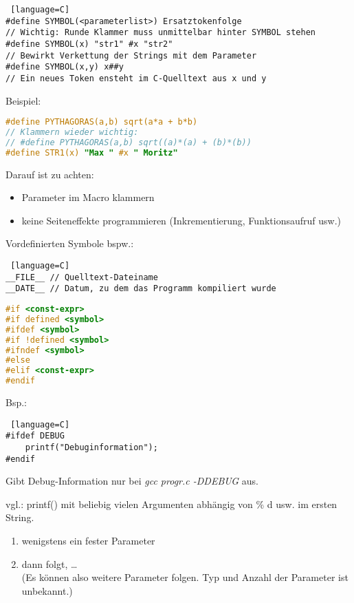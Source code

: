 \begin{multicols*}{3}

\begin{lstlisting} [language=C]
#define SYMBOL(<parameterlist>)	Ersatztokenfolge
// Wichtig: Runde Klammer muss unmittelbar hinter SYMBOL stehen
#define SYMBOL(x) "str1" #x "str2"
// Bewirkt Verkettung der Strings mit dem Parameter
#define SYMBOL(x,y) x##y
// Ein neues Token ensteht im C-Quelltext aus x und y
\end{lstlisting}
Beispiel:
\begin{lstlisting}[language=C]
#define PYTHAGORAS(a,b) sqrt(a*a + b*b)
// Klammern wieder wichtig:
// #define PYTHAGORAS(a,b) sqrt((a)*(a) + (b)*(b))
#define STR1(x) "Max " #x " Moritz"
\end{lstlisting}
Darauf ist zu achten:
\begin{itemize}
\item Parameter im Macro klammern
\item keine Seiteneffekte programmieren (Inkrementierung, Funktionsaufruf usw.)
\end{itemize}
Vordefinierten Symbole bspw.:
\begin{lstlisting} [language=C]
__FILE__ // Quelltext-Dateiname
__DATE__ // Datum, zu dem das Programm kompiliert wurde
\end{lstlisting}


\begin{lstlisting}[language=C]
#if <const-expr>
#if defined <symbol>
#ifdef <symbol>
#if !defined <symbol>
#ifndef <symbol>
#else 
#elif <const-expr>
#endif
\end{lstlisting}
Bsp.:
\begin{lstlisting} [language=C]
#ifdef DEBUG
	printf("Debuginformation");
#endif
\end{lstlisting}
Gibt Debug-Information nur bei \emph{gcc progr.c -DDEBUG} aus.

\HRule[4pt]

vgl.: printf() mit beliebig vielen Argumenten abhängig von \% d usw. im ersten String.
\begin{enumerate}
\item wenigstens ein fester Parameter
\item dann folgt, … \\
(Es können also weitere Parameter folgen. Typ und Anzahl der Parameter ist unbekannt.)
\end{enumerate}


\end{multicols*}
